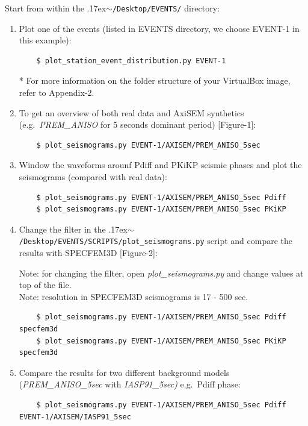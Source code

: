 \documentclass{article}
\newcommand{\ttilde}[0]{\raise.17ex\hbox{$\scriptstyle\sim$}}
\begin{document}
Start from within the \ttilde\verb|/Desktop/EVENTS/| directory:

\begin{enumerate}
    
    \item Plot one of the events (listed in EVENTS directory, we choose EVENT-1
    in this example):
    
    \begin{verbatim}
    $ plot_station_event_distribution.py EVENT-1
    \end{verbatim}
    * For more information on the folder structure of your VirtualBox image,
    refer to Appendix-2.
    
    \item To get an overview of both real data and AxiSEM synthetics 
    (e.g.\ \textit{PREM\_ANISO} for 5 seconds dominant period) [Figure-1]:
    \begin{verbatim}
    $ plot_seismograms.py EVENT-1/AXISEM/PREM_ANISO_5sec
    \end{verbatim}
    
    \item Window the waveforms arounf Pdiff and PKiKP seismic phases and plot
    the seismograms (compared with real data):
    \begin{verbatim}
    $ plot_seismograms.py EVENT-1/AXISEM/PREM_ANISO_5sec Pdiff
    $ plot_seismograms.py EVENT-1/AXISEM/PREM_ANISO_5sec PKiKP
    \end{verbatim}
    
    \item Change the filter in the
    \ttilde\verb|/Desktop/EVENTS/SCRIPTS/plot_seismograms.py| script and
    compare the results with SPECFEM3D [Figure-2]:
    
    Note: for changing the filter, open \textit{plot\_seismograms.py} and
    change values at top of the file. \\
    Note: resolution in SPECFEM3D seismograms is 17 - 500 sec.
    \begin{verbatim}
    $ plot_seismograms.py EVENT-1/AXISEM/PREM_ANISO_5sec Pdiff specfem3d
    $ plot_seismograms.py EVENT-1/AXISEM/PREM_ANISO_5sec PKiKP specfem3d
    \end{verbatim}
    
    \item Compare the results for two different background models
    (\textit{PREM\_ANISO\_5sec} with \textit{IASP91\_5sec)} e.g.\ Pdiff phase:
    
    \begin{verbatim}
    $ plot_seismograms.py EVENT-1/AXISEM/PREM_ANISO_5sec Pdiff EVENT-1/AXISEM/IASP91_5sec
    \end{verbatim}
    

\end{enumerate}
\end{document}
